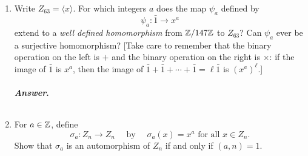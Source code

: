 \documentclass[11pt, reqno]{amsart}
\theoremstyle{plain}
\theoremstyle{definition}
\theoremstyle{example}
\newenvironment{ans}{\color{black}\medskip \paragraph*{\emph{Answer}.}}{\hfill \break  $~\!\!$ \dotfill \medskip }
\def\<{\langle} \def\>{\rangle}
\begin{document}
\begin{enumerate}[1.]
\begin{enumerate}
\begin{proof}
Suppose $G$ is a group with finite order and $x \in G$. Also suppose that $|x| = |G|$.\\

Now suppose there exists $y \in G$ such that $y \neq x^k$ for some $k \in \ZZ$. Note that since we know $|x| = n$, we can list out a subset of the elements in $G$. Hence, we have
\begin{align*}
\{1, x, x^2, \cdots, x^{n-1}, y\} \subset G
\end{align*}

However, note that $\{1, x, x^2, \cdots, x^{n-1}, y\} = n + 1 > |G|$. But since this is a subset of $G$, we have that,
\begin{align*}
|\{1, x, x^2, \cdots, x^{n-1}, y\}| \leq G
\end{align*}

So we have a contradiction and thus, this $y \neq x^k$ cannot exist. Hence, $G = \<x\>$.\\

Now consider the infinite group $(\mathbb{R}, +)$. We have that $|\mathbb{R}| = \infty = |2|$. However, $\mathbb{R} \neq \<1\>$ because $1 \in \mathbb{Z}$ and $\mathbb{Z}$ is closed under addition, so $\mathbb{R} \setminus \mathbb{Z}$ is not generated by $\<1\>$.
\end{proof}

\item Write $Z_{63} = \<x\>$. For which integers $a$ does the map $\psi_a$ defined by 
$$\psi_a : \bar{1} \to x^a$$
extend to a \emph{well defined homomorphism} from $\mathbb{Z}/147 \mathbb{Z}$ to $Z_{63}$? Can $\psi_a$ ever be a surjective homomorphism? 
{\small[Take care to remember that the binary operation on the left is $+$ and the binary operation on the right is $\times$: if the image of  $\bar{1}$ is $x^a$, then the image of $\bar{1} + \bar{1} + \cdots + \bar{1} = \ell\bar{1}$ is $(x^{a})^{\ell}$.]}
\begin{ans}

\end{ans}

\item For $a \in \mathbb{Z}$, define 
$$\sigma_a: Z_n \to Z_n \quad \text{ by } \quad \sigma_a(x) = x^a \text{ for all } x \in Z_n.$$
Show that $\sigma_a$ is an automorphism of $Z_n$ if and only if $(a, n) = 1$. 


\end{enumerate}
\end{enumerate}
\end{document}
